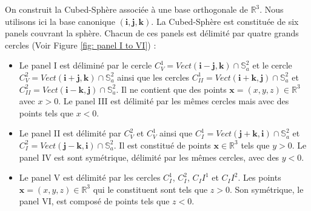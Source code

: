 On construit la Cubed-Sphère associée à une base orthogonale de $\mathbb{R}^3$. Nous utilisons ici la base canonique $(\mathbf{i}, \mathbf{j}, \mathbf{k})$. La Cubed-Sphère est constituée de six panels couvrant la sphère. Chacun de ces panels est délimité par quatre grands cercles (Voir Figure \ref{fig: panel I to VI}) :

\begin{itemize}
\item Le panel I est déliminé par le cercle $C_V^1 = Vect(\mathbf{i}-\mathbf{j}, \mathbf{k}) \cap \mathbb{S}_a^2$ et le cercle $C_V^2 = Vect(\mathbf{i}+\mathbf{j}, \mathbf{k}) \cap \mathbb{S}_a^2$ ainsi que les cercles $C_{II}^1 = Vect(\mathbf{i}+\mathbf{k}, \mathbf{j}) \cap \mathbb{S}_a^2$ et $C_{II}^2 = Vect(\mathbf{i}-\mathbf{k}, \mathbf{j}) \cap \mathbb{S}_a^2$. Il ne contient que des points $\mathbf{x}=(x,y,z) \in \mathbb{R}^3$ avec $x>0$. Le panel III est délimité par les mêmes cercles mais avec des points tels que $x<0$.
\item Le panel II est délimité par $C_V^2$ et $C_V^1$ ainsi que $C_I^1=Vect(\mathbf{j}+\mathbf{k},\mathbf{i}) \cap \mathbb{S}_a^2$ et $C_I^2=Vect(\mathbf{j}-\mathbf{k},\mathbf{i}) \cap \mathbb{S}_a^2$. Il est constitué de points $\mathbf{x} \in \mathbb{R}^3$ tels que $y>0$. Le panel IV est sont symétrique, délimité par les mêmes cercles, avec des $y<0$.
\item Le panel V est délimité par les cercles $C_I^1$, $C_I^2$, $C_II^1$ et $C_II^2$. Les points $\mathbf{x} = (x,y,z) \in \mathbb{R}^3$ qui le constituent sont tels que $z>0$. Son symétrique, le panel VI, est composé de points tels que $z<0$.
\end{itemize}

